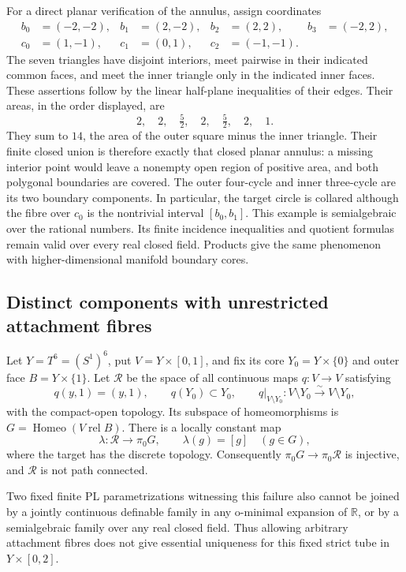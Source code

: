 For a direct planar verification of the annulus, assign coordinates
\[
\begin{aligned}
 b_0&=(-2,-2),&b_1&=(2,-2),&b_2&=(2,2),&b_3&=(-2,2),\\
 c_0&=(1,-1),&c_1&=(0,1),&c_2&=(-1,-1).
\end{aligned}
\]
The seven triangles have disjoint interiors, meet pairwise in
their indicated common faces, and meet the inner triangle only
in the indicated inner faces.  These assertions follow by the
linear half-plane inequalities of their edges.  Their areas, in
the order displayed, are
\[
 2,\quad2,\quad\tfrac52,\quad2,\quad\tfrac52,\quad2,\quad1.
\]
They sum to $14$, the area of the outer square minus the inner
triangle.  Their finite closed union is therefore exactly that
closed planar annulus: a missing interior point would leave a
nonempty open region of positive area, and both polygonal
boundaries are covered.  The outer four-cycle and inner
three-cycle are its two boundary components.  In particular,
the target circle is collared although the fibre over $c_0$ is
the nontrivial interval $[b_0,b_1]$.  This example is semialgebraic
over the rational numbers.  Its finite incidence inequalities
and quotient formulas remain valid over every real closed field.
Products give the same phenomenon with higher-dimensional
manifold boundary cores.

\subsection{Distinct components with unrestricted attachment fibres}

\begin{theorem}\label{thm:unrestricted-tube-components}
Let $Y=T^6=(S^1)^6$, put $V=Y\times[0,1]$, and fix its core
$Y_0=Y\times\{0\}$ and outer face $B=Y\times\{1\}$.
Let $\mathcal R$ be the space of all continuous maps $q:V\to V$
satisfying
\[
 q(y,1)=(y,1),\qquad q(Y_0)\subset Y_0,\qquad
 q|_{V\setminus Y_0}:V\setminus Y_0\xrightarrow{\sim}V\setminus Y_0,
\]
with the compact-open topology.  Its subspace of homeomorphisms
is $G=\operatorname{Homeo}(V\;\mathrm{rel}\;B)$.
There is a locally constant map
\[
 \lambda:\mathcal R\longrightarrow\pi_0G,
 \qquad\lambda(g)=[g]\quad(g\in G),
\]
where the target has the discrete topology.  Consequently
$\pi_0G\longrightarrow\pi_0\mathcal R$ is injective, and
$\mathcal R$ is not path connected.

Two fixed finite PL parametrizations witnessing this failure
also cannot be joined by a jointly continuous definable family
in any o-minimal expansion of $\mathbb R$, or by a semialgebraic
family over any real closed field.  Thus allowing arbitrary
attachment fibres does not give essential uniqueness for this
fixed strict tube in $Y\times[0,2]$.
\end{theorem}

